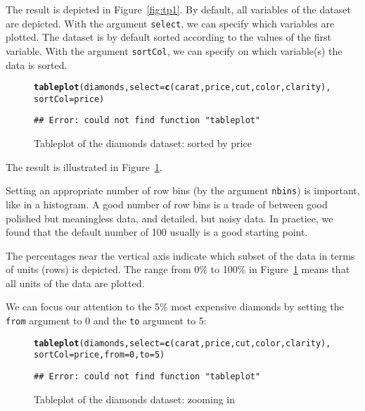 \documentclass[11pt, fleqn, a4paper]{article}\usepackage{graphicx, color}
\makeatletter
\newcommand{\hlfunctioncall}[1]{\textcolor[rgb]{0.501960784313725,0,0.329411764705882}{\textbf{#1}}}%
\newenvironment{kframe}{%
 \def\FrameCommand##1{\hskip\@totalleftmargin \hskip-\fboxsep
 \colorbox{shadecolor}{##1}\hskip-\fboxsep
     \hskip-\linewidth \hskip-\@totalleftmargin \hskip\columnwidth}%
 \MakeFramed {\advance\hsize-\width
   \@totalleftmargin\z@ \linewidth\hsize
   \@setminipage}}%
 {\par\unskip\endMakeFramed}
\newenvironment{knitrout}{}{} %
\makeatother
\begin{document}
The result is depicted in Figure~\ref{fig:tp1}. By default, all variables of the dataset are depicted. With the argument {\tt select}, we can specify which variables are plotted. The dataset is by default sorted according to the values of the first variable. With the argument {\tt sortCol}, we can specify on which variable(s) the data is sorted.

\begin{figure}[htp]
\begin{knitrout}
\color{fgcolor}\begin{kframe}
\begin{alltt}
\hlfunctioncall{tableplot}(diamonds, select = \hlfunctioncall{c}(carat, price, cut, color, clarity), 
    sortCol = price)
\end{alltt}
\begin{verbatim}
## Error: could not find function "tableplot"
\end{verbatim}
\end{kframe}
\end{knitrout}

\caption{Tableplot of the diamonds dataset: sorted by price}
\label{fig:tp2}
\end{figure}

The result is illustrated in Figure~\ref{fig:tp2}. 

Setting an appropriate number of row bins (by the argument {\tt nbins}) is important, like in a histogram. A good number of row bins is a trade of between good polished but meaningless data, and detailed, but noisy data. In practice, we found that the default number of 100 usually is a good starting point.

The percentages near the vertical axis indicate which subset of the data in terms of units (rows) is depicted. The range from 0\% to 100\% in Figure~\ref{fig:tp2} means that all units of the data are plotted. 


We can focus our attention to the 5\% most expensive diamonds by setting the {\tt from} argument to 0 and the {\tt to} argument to 5:


\begin{figure}[htp]
\begin{knitrout}
\color{fgcolor}\begin{kframe}
\begin{alltt}
\hlfunctioncall{tableplot}(diamonds, select = \hlfunctioncall{c}(carat, price, cut, color, clarity), 
    sortCol = price, from = 0, to = 5)
\end{alltt}
\begin{verbatim}
## Error: could not find function "tableplot"
\end{verbatim}
\end{kframe}
\end{knitrout}

\caption{Tableplot of the diamonds dataset: zooming in}
\label{fig:tp3}
\end{figure}
\end{document}
